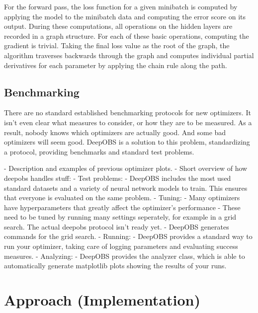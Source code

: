\documentclass[twoside,12pt,a4paper]{report}
\begin{document}
For the forward pass, the loss function for a given minibatch is computed by applying the model to the minibatch data and computing the error score on its output. During these computations, all operations on the hidden layers are recorded in a graph structure. For each of these basic operations, computing the gradient is trivial. Taking the final loss value as the root of the graph, the algorithm traverses backwards through the graph and computes individual partial derivatives for each parameter by applying the chain rule along the path.

\section{Benchmarking}
\begin{markdown}
There are no standard established benchmarking protocols for new optimizers. It isn't even clear what measures to consider, or how they are to be measured. As a result, nobody knows which optimizers are actually good. And some bad optimizers will seem good.
DeepOBS is a solution to this problem, standardizing a protocol, providing benchmarks and standard test problems.

- Description and examples of previous optimizer plots.
- Short overview of how deepobs handles stuff:
    - Test problems:
      	- DeepOBS includes the most used standard datasets and a variety of neural network models to train. This ensures that everyone is evaluated on the same problem.
    - Tuning:
    	- Many optimizers have hyperparameters that greatly affect the optimizer's performance
 	    - These need to be tuned by running many settings seperately, for example in a grid search. The actual deepobs protocol isn't ready yet.
      - DeepOBS generates commands for the grid search.
    - Running:
      	- DeepOBS provides a standard way to run your optimizer, taking care of logging parameters and evaluating success measures.
    - Analyzing:
      	- DeepOBS provides the analyzer class, which is able to automatically generate matplotlib plots showing the results of your runs.
\end{markdown}



\chapter{Approach (Implementation)}
\end{document}
